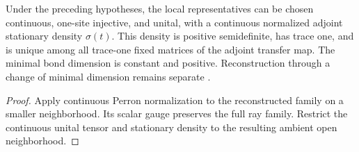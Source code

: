\begin{lemma}
    \label{thm:spt_continuous_canonical_ray_realization}
    \leanok
    Under the preceding hypotheses, the local representatives can
    be chosen continuous, one-site injective, and unital, with a
    continuous normalized adjoint stationary density $\sigma(t)$.
    This density is positive semidefinite, has trace one, and is unique
    among all trace-one fixed matrices of the adjoint transfer map.
    The minimal bond dimension is constant and positive. Reconstruction
    through a change of minimal dimension remains separate
    \cite{gap:spc11_spt_interpolation_upper_range}.
\end{lemma}
\begin{proof}\leanok
    Apply continuous Perron normalization to the reconstructed family
    on a smaller neighborhood. Its scalar gauge preserves the full
    ray family. Restrict the continuous unital tensor and stationary
    density to the resulting ambient open neighborhood.
\end{proof}
